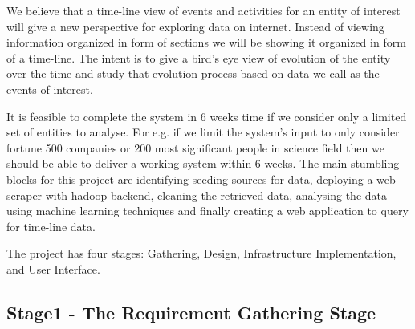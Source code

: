 \documentclass[10pt,conference]{IEEEtran}
\begin{document}
We believe that a time-line view of events and activities for an entity of
interest will give a new perspective for exploring data on internet. Instead of
viewing information organized in form of sections we will be showing it
organized in form of a time-line. The intent is to give a bird's eye view of
evolution of the entity over the time and study that evolution process based on
data we call as the events of interest.

It is feasible to complete the system in 6 weeks time if we consider only a
limited set of entities to analyse. For e.g. if we limit the system's input to
only consider fortune 500 companies or 200 most significant people in science
field then we should be able to deliver a working system within 6 weeks. The
main stumbling blocks for this project are identifying seeding sources for
data, deploying a web-scraper with hadoop backend, cleaning the retrieved data,
analysing the data using machine learning techniques and finally creating a web
application to query for time-line data.

The project has four stages: Gathering, Design, Infrastructure Implementation,
and User Interface.

\subsection{Stage1 - The Requirement Gathering Stage}
\label{sec:requirement-gathering-stage}


%

%

%

%




\nocite{*}
\end{document}
